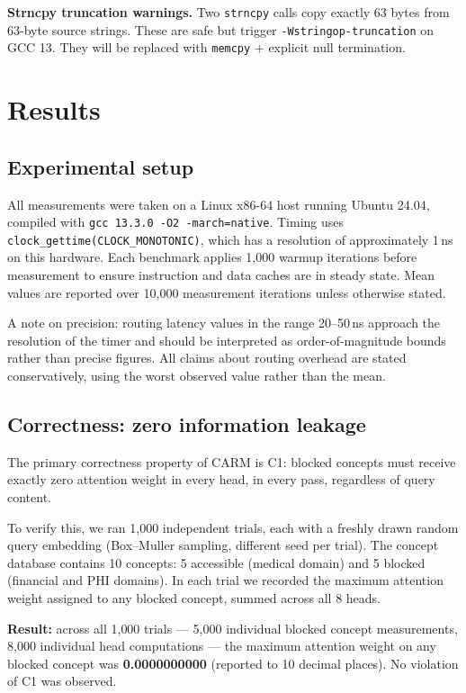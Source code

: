 \documentclass[11pt,a4paper]{article}
\theoremstyle{definition}
\begin{document}
\textbf{Strncpy truncation warnings.} Two \texttt{strncpy} calls copy exactly
63 bytes from 63-byte source strings. These are safe but trigger
\texttt{-Wstringop-truncation} on GCC 13. They will be replaced with
\texttt{memcpy} + explicit null termination.

\section{Results}
\label{sec:results}

\subsection{Experimental setup}

All measurements were taken on a Linux x86-64 host running Ubuntu 24.04,
compiled with \texttt{gcc 13.3.0 -O2 -march=native}. Timing uses
\texttt{clock\_gettime(CLOCK\_MONOTONIC)}, which has a resolution of
approximately 1\,ns on this hardware. Each benchmark applies 1{,}000 warmup
iterations before measurement to ensure instruction and data caches are in
steady state. Mean values are reported over 10{,}000 measurement iterations
unless otherwise stated.

A note on precision: routing latency values in the range 20--50\,ns approach
the resolution of the timer and should be interpreted as order-of-magnitude
bounds rather than precise figures. All claims about routing overhead are
stated conservatively, using the worst observed value rather than the mean.

\subsection{Correctness: zero information leakage}
\label{sec:leakage}

The primary correctness property of CARM is C1: blocked concepts must receive
exactly zero attention weight in every head, in every pass, regardless of
query content.

To verify this, we ran 1{,}000 independent trials, each with a freshly drawn
random query embedding (Box--Muller sampling, different seed per trial). The
concept database contains 10 concepts: 5 accessible (medical domain) and 5
blocked (financial and PHI domains). In each trial we recorded the maximum
attention weight assigned to any blocked concept, summed across all 8 heads.

\textbf{Result:} across all 1{,}000 trials --- 5{,}000 individual blocked
concept measurements, 8{,}000 individual head computations --- the maximum
attention weight on any blocked concept was \textbf{0.0000000000} (reported
to 10 decimal places). No violation of C1 was observed.
\end{document}

